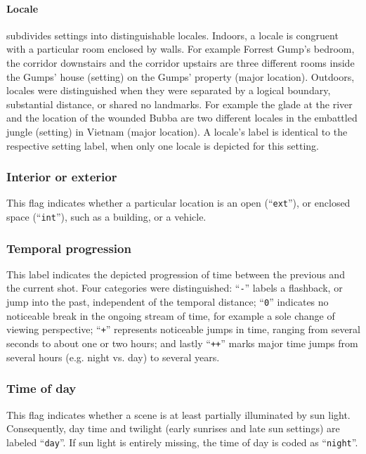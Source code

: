 \documentclass[10pt,a4paper,twocolumn]{article}
\begin{document}
\paragraph{Locale} subdivides settings into distinguishable locales.  Indoors, a
locale is congruent with a particular room enclosed by walls. For example
Forrest Gump's bedroom, the corridor downstairs and the corridor upstairs are
three different rooms inside the Gumps' house (setting) on the Gumps' property
(major location). Outdoors, locales were distinguished when they were separated
by a logical boundary, substantial distance, or shared no landmarks.  For
example the glade at the river and the location of the wounded Bubba are two
different locales in the embattled jungle (setting) in Vietnam (major
location). A locale's label is identical to the respective setting label, when
only one locale is depicted for this setting.


\subsubsection*{Interior or exterior}

This flag indicates whether a particular location is an open
(``\texttt{ext}''), or enclosed space (``\texttt{int}''), such as a building,
or a vehicle.


\subsubsection*{Temporal progression}

This label indicates the depicted progression of time between the previous and
the current shot. Four categories were distinguished: ``\texttt{-}'' labels a
flashback, or jump into the past, independent of the temporal distance;
``\texttt{0}'' indicates no noticeable break in the ongoing stream of time, for
example a sole change of viewing perspective; ``\texttt{+}'' represents
noticeable jumps in time, ranging from several seconds to about one or two
hours; and lastly ``\texttt{++}'' marks major time jumps from several hours
(e.g.  night vs. day) to several years.


\subsubsection*{Time of day}

This flag indicates whether a scene is at least partially illuminated by sun
light. Consequently, day time and twilight (early sunrises and late sun
settings) are labeled ``\texttt{day}''. If sun light is entirely missing,
the time of day is coded as ``\texttt{night}''.
\end{document}
